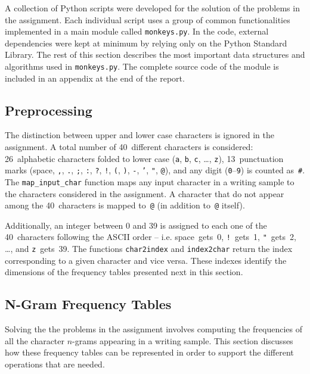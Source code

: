 \documentclass[conference]{IEEEtran}
\newcommand{\codeinline}[1]{{\fontsize{8}{0}\selectfont\texttt{#1}}}
\begin{document}
A collection of Python scripts were developed for the solution of the problems in the assignment.
Each individual script uses a group of common functionalities implemented in a main module called \codeinline{monkeys.py}.
In the code, external dependencies were kept at minimum by relying only on the Python Standard Library.
The rest of this section describes the most important data structures and algorithms used in \codeinline{monkeys.py}.
The complete source code of the module is included in an appendix at the end of the report.

\subsection{Preprocessing}

The distinction between upper and lower case characters is ignored in the assignment.
A total number of 40~different characters is considered: 
26~alphabetic characters folded to lower case (\codeinline{a}, \codeinline{b}, \codeinline{c}, \ldots, \codeinline{z}), 
13~punctuation marks (space, \codeinline{,}, \codeinline{.}, \codeinline{;}, \codeinline{:}, \codeinline{?}, \codeinline{!}, \codeinline{(}, \codeinline{)}, \codeinline{-}, \codeinline{'}, \codeinline{"}, \codeinline{@}),
and any digit (\codeinline{0}--\codeinline{9}) is counted as~\codeinline{\#}.
The \codeinline{map\_input\_char} function maps any input character in a writing sample to the characters considered in the assignment.
A character that do not appear among the 40~characters is mapped to~\codeinline{@} (in addition to~\codeinline{@} itself).

Additionally, an integer between 0 and 39 is assigned to each one of the 40~characters following the ASCII order
-- i.e. space~gets~0, \codeinline{!}~gets~1, \codeinline{"}~gets~2, \ldots, and \codeinline{z}~gets~39.
The functions \codeinline{char2index} and \codeinline{index2char} return the index corresponding to a given character and vice versa.
These indexes identify the dimensions of the frequency tables presented next in this section.

\subsection{N-Gram Frequency Tables}

Solving the the problems in the assignment involves computing the frequencies of all the character $n$-grams appearing in a writing sample.
This section discusses how these frequency tables can be represented in order to support the different operations that are needed.
\end{document}

